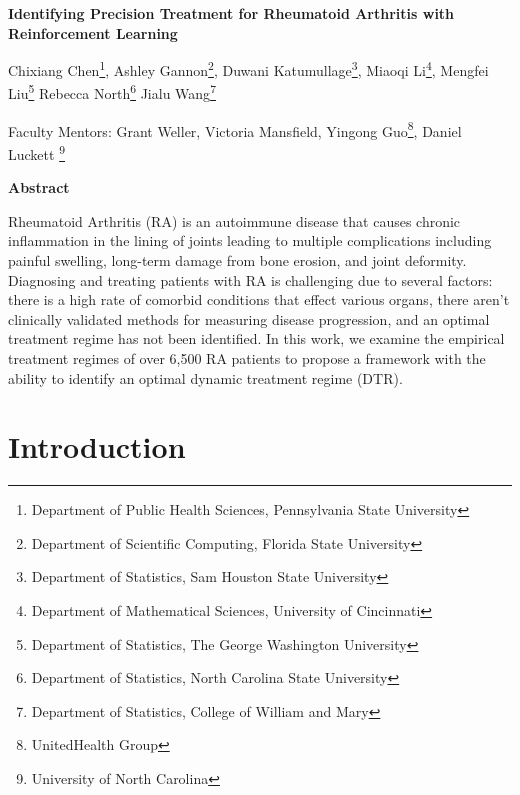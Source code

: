 \documentclass[10pt]{article}
\begin{document}
\centerline{\large \bf Identifying Precision Treatment for Rheumatoid Arthritis with Reinforcement Learning}

\vspace{.1truein}

\def\thefootnote{\arabic{footnote}}
\begin{center}
  Chixiang Chen\footnote{Department of Public Health Sciences, Pennsylvania State University},
  Ashley Gannon\footnote{Department of Scientific Computing, Florida State University},
  Duwani Katumullage\footnote{Department of Statistics, Sam Houston State University},
  Miaoqi Li\footnote{Department of Mathematical Sciences, University of Cincinnati},
  Mengfei Liu\footnote{Department of Statistics, The George Washington University}
  Rebecca North\footnote{Department of Statistics, North Carolina State University}
  Jialu Wang\footnote{Department of Statistics, College of William and Mary}
\end{center}


\begin{center}
Faculty Mentors: Grant Weller, Victoria Mansfield, Yingong Guo\footnote{UnitedHealth Group},
Daniel Luckett \footnote{University of North Carolina}
\end{center}

\vspace{.3truein}
\centerline{\bf Abstract}

Rheumatoid Arthritis (RA) is an autoimmune disease that causes chronic inflammation in the lining of joints leading to multiple complications including painful swelling, long-term damage from bone erosion, and joint deformity. Diagnosing and treating patients with RA is challenging due to several factors: there is a high rate of comorbid conditions that effect various organs, there aren't clinically validated methods for measuring disease progression, and an optimal treatment regime has not been identified. In this work, we examine the empirical treatment regimes of over 6,500 RA patients to propose a framework with the ability to identify an optimal dynamic treatment regime (DTR). 


\section{Introduction}
\end{document}
